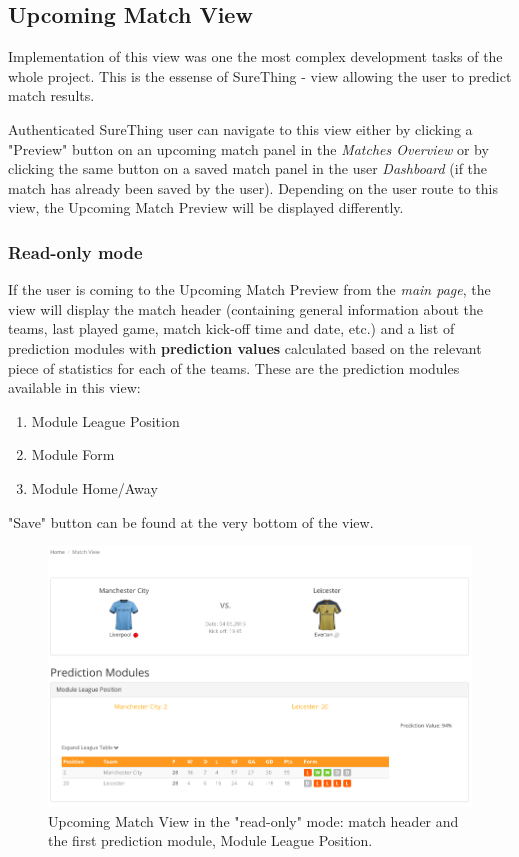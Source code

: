 \subsection{Upcoming Match View}
\label{subsec:implementupcomingmatchview}
Implementation of this view was one the most complex development tasks of the whole project. This is the essense of SureThing - view allowing the user to predict match results. 

Authenticated SureThing user can navigate to this view either by clicking a "Preview" button on an upcoming match panel in the \emph{Matches Overview} or by clicking the same button on a saved match panel in the user \emph{Dashboard} (if the match has already been saved by the user). Depending on the user route to this view, the Upcoming Match Preview will be displayed differently.

\subsubsection*{Read-only mode}
If the user is coming to the Upcoming Match Preview from the \emph{main page}, the view will display the match header (containing general information about the teams, last played game, match kick-off time and date, etc.) and a list of prediction modules with \textbf{prediction values} calculated based on the relevant piece of statistics for each of the teams. These are the prediction modules available in this view: 

\begin{enumerate}
	\item Module League Position
	\item Module Form
	\item Module Home/Away
\end{enumerate}

"Save" button can be found at the very bottom of the view.

\begin{figure}[H]
	\begin{center}
		\includegraphics[width=.90\textwidth]{impl/images/upcomingMatchView}
		\caption{Upcoming Match View in the "read-only" mode: match header and the first prediction module, Module League Position.} 
		\label{fig:using:upcominmatchview}
	\end{center}
\end{figure}

